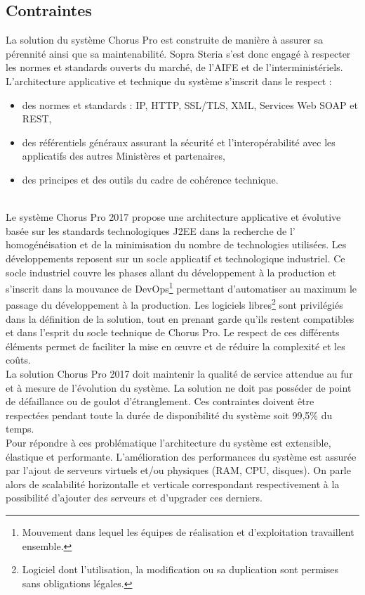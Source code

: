 \documentclass[12pt,a4paper]{article}
\begin{document}
\subsection{Contraintes}
La solution du système Chorus Pro est construite de manière à assurer sa pérennité ainsi que sa maintenabilité. Sopra Steria s'est donc engagé à respecter les normes et standards ouverts du marché, de l'AIFE et de l'interministériels. L’architecture applicative et technique du système s’inscrit dans le respect : 
\begin{itemize}
\item	des normes et standards : IP, HTTP, SSL/TLS, XML, Services Web \gls{SOAP} et \gls{REST},
\item	des référentiels généraux assurant la sécurité et l’interopérabilité avec les applicatifs des autres Ministères et partenaires,
\item	des principes et des outils du cadre de cohérence technique.
\end{itemize}
~~\\
Le système Chorus Pro 2017 propose une architecture applicative et évolutive basée sur les standards technologiques \gls{J2EE} dans la recherche de l’ homogénéisation et de la minimisation du nombre de technologies utilisées. Les développements reposent sur un socle applicatif et technologique industriel. Ce socle industriel couvre les phases allant du développement à la production et s’inscrit dans la mouvance de DevOps\footnote{Mouvement dans lequel les équipes de réalisation et d'exploitation travaillent ensemble.} permettant d’automatiser au maximum le passage du développement à la production. Les logiciels libres\footnote{Logiciel dont l'utilisation, la modification ou sa duplication sont permises sans obligations légales.} sont privilégiés dans la définition de la solution, tout en prenant garde qu’ils restent compatibles et dans l’esprit du socle technique de Chorus Pro. Le respect de ces différents éléments permet de faciliter la mise en œuvre et de réduire la complexité et les coûts.\\
La solution Chorus Pro 2017 doit maintenir la qualité de service attendue au fur et à mesure de l’évolution du système. La solution ne doit pas posséder de point de défaillance ou de goulot d'étranglement. Ces contraintes doivent être respectées pendant toute la durée de disponibilité du système soit 99,5\% du temps.\\
Pour répondre à ces problématique l'architecture du système est extensible, élastique et performante. L'amélioration des performances du système est assurée par l'ajout de serveurs virtuels et/ou physiques (\gls{RAM}, \gls{CPU}, disques). On parle alors de scalabilité horizontalle et verticale correspondant respectivement à la possibilité d'ajouter des serveurs et d'upgrader ces derniers.
\end{document}
